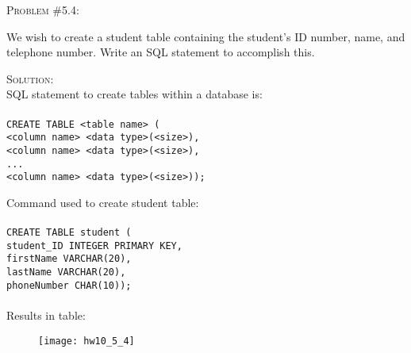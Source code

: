 \documentclass[12pt]{article}
\newenvironment{problem}[1]
{\begin{mdframed}[linewidth=0.8pt]
        \textsc{Problem #1:}

}
    {\end{mdframed}}
\newenvironment{solution}
    {\textsc{Solution:}\\}
    {\newpage}%
\begin{document}
	\begin{problem}{\#5.4}
		We wish to create a student table containing the student's ID number, name,
		and telephone number. Write an SQL statement to accomplish this.
	\end{problem}
	\begin{solution}
		SQL statement to create tables within a database is:\\
		\\
		\verb|CREATE TABLE <table name> (|\\
		\verb|<column name> <data type>(<size>),|\\
		\verb|<column name> <data type>(<size>),|\\
		\verb|...|\\
		\verb|<column name> <data type>(<size>));|

		Command used to create student table:\\
		\\
		\verb|CREATE TABLE student (|\\
		\verb|student_ID INTEGER PRIMARY KEY,|\\
		\verb|firstName VARCHAR(20),|\\
		\verb|lastName VARCHAR(20),|\\
		\verb|phoneNumber CHAR(10));|\\
		\\
		Results in table:\\
		\begin{figure}[ht!]
			\centering
			\texttt{[image: hw10\_5\_4]}
			\label{fig:hw_10_5_4}
		\end{figure}
	\end{solution}
\end{document}
